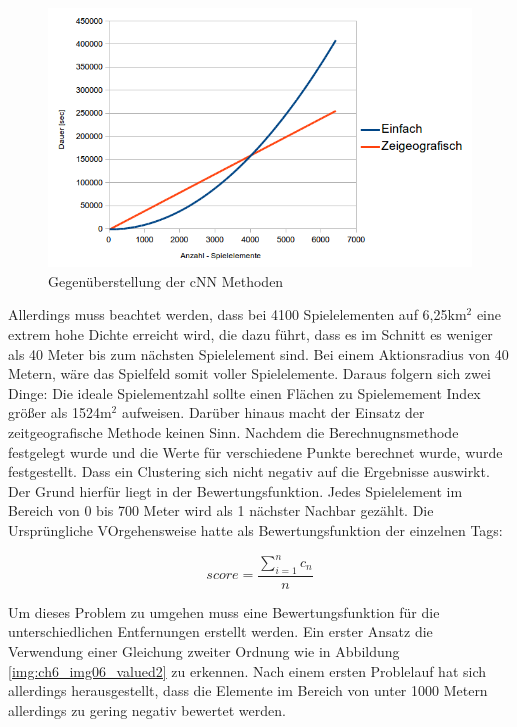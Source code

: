 \begin{figure}[H]
\begin{center}
\includegraphics[width=150mm]{images/ch6_img05_eval_match.png}
\caption{Gegenüberstellung der cNN Methoden}
\label{img:ch6_img05_eval_match}
\end{center}
\end{figure}

Allerdings muss beachtet werden, dass bei 4100 Spielelementen auf 6,25km$^2$ eine extrem hohe Dichte erreicht wird, die dazu führt, dass es im Schnitt es weniger als 40 Meter bis zum nächsten Spielelement sind. Bei einem Aktionsradius von 40 Metern, wäre das Spielfeld somit voller Spielelemente. Daraus folgern sich zwei Dinge:
Die ideale Spielementzahl sollte einen Flächen zu Spielemement Index größer als 1524m$^2$ aufweisen.
Darüber hinaus macht der Einsatz der zeitgeografische Methode keinen Sinn.
Nachdem die Berechnugnsmethode festgelegt wurde und die Werte für verschiedene Punkte berechnet wurde, wurde festgestellt. Dass ein Clustering sich nicht negativ auf die Ergebnisse auswirkt.
Der Grund hierfür liegt in der Bewertungsfunktion. Jedes Spielelement im Bereich von 0 bis 700 Meter wird als 1 nächster Nachbar gezählt.
Die Ursprüngliche VOrgehensweise hatte als Bewertungsfunktion der einzelnen Tags:

\begin{equation}
score = \frac{ \sum\limits_{i=1}^n c_n }{n}
\end{equation}

Um dieses Problem zu umgehen muss eine Bewertungsfunktion für die unterschiedlichen Entfernungen erstellt werden. Ein erster Ansatz die Verwendung einer Gleichung zweiter Ordnung wie in Abbildung \ref{img:ch6_img06_valued2} zu erkennen. Nach einem ersten Problelauf hat sich allerdings herausgestellt, dass die Elemente im Bereich von unter 1000 Metern allerdings zu gering negativ bewertet werden.

